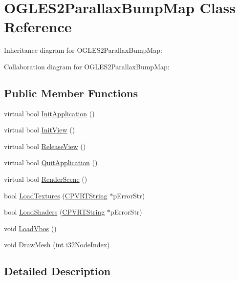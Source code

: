 \hypertarget{class_o_g_l_e_s2_parallax_bump_map}{\section{O\+G\+L\+E\+S2\+Parallax\+Bump\+Map Class Reference}
\label{class_o_g_l_e_s2_parallax_bump_map}
}


Inheritance diagram for O\+G\+L\+E\+S2\+Parallax\+Bump\+Map\+:


Collaboration diagram for O\+G\+L\+E\+S2\+Parallax\+Bump\+Map\+:
\subsection*{Public Member Functions}
\begin{DoxyCompactItemize}
\item 
virtual bool \hyperlink{class_o_g_l_e_s2_parallax_bump_map_a8c5a4b51078afb1b3ae9bdb4d98c9582}{Init\+Application} ()
\item 
virtual bool \hyperlink{class_o_g_l_e_s2_parallax_bump_map_abf35d28154fdeeb0096793042efdc936}{Init\+View} ()
\item 
virtual bool \hyperlink{class_o_g_l_e_s2_parallax_bump_map_ae37f5abcaaf892c2f484405aa2355d16}{Release\+View} ()
\item 
virtual bool \hyperlink{class_o_g_l_e_s2_parallax_bump_map_a1f592cedefb2795fa7389307af963a5d}{Quit\+Application} ()
\item 
virtual bool \hyperlink{class_o_g_l_e_s2_parallax_bump_map_a9c769a11b2b62a28492d39bed4bcbcd3}{Render\+Scene} ()
\item 
bool \hyperlink{class_o_g_l_e_s2_parallax_bump_map_abbbbb5d4ea979ba3bda0d82eb7688529}{Load\+Textures} (\hyperlink{class_c_p_v_r_t_string}{C\+P\+V\+R\+T\+String} $\ast$p\+Error\+Str)
\item 
bool \hyperlink{class_o_g_l_e_s2_parallax_bump_map_ac97a11409cd026afcc310e2e094f35d2}{Load\+Shaders} (\hyperlink{class_c_p_v_r_t_string}{C\+P\+V\+R\+T\+String} $\ast$p\+Error\+Str)
\item 
void \hyperlink{class_o_g_l_e_s2_parallax_bump_map_a42ee21ca75649a5f5c58882cc1178dee}{Load\+Vbos} ()
\item 
void \hyperlink{class_o_g_l_e_s2_parallax_bump_map_afc496d22f21260998ae837f7bdf193ed}{Draw\+Mesh} (int i32\+Node\+Index)
\end{DoxyCompactItemize}


\subsection{Detailed Description}


